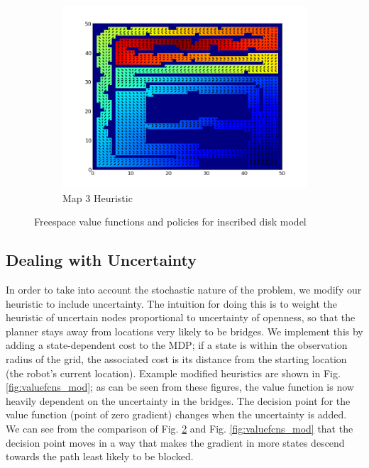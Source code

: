 \documentclass{article}
\begin{document}
\begin{figure}[ht]
\begin{subfigure}[b]{0.45\textwidth}
        \includegraphics[width = \textwidth]{map3value.png}
        \caption{Map 3 Heuristic}
        \label{fig:map3value}
    \end{subfigure}
    \caption{Freespace value functions and policies for inscribed disk model}
    \label{fig:valuefcns}
\end{figure}

\subsection{Dealing with Uncertainty}

In order to take into account the stochastic nature of the problem, we modify our heuristic to include uncertainty. The intuition for doing this is to weight the heuristic of uncertain nodes proportional to uncertainty of openness, so that the planner stays away from locations very likely to be bridges. We implement this by adding a state-dependent cost to the MDP; if a state is within the observation radius of the grid, the associated cost is its distance from the starting location (the robot's current location). Example modified heuristics are shown in Fig. \ref{fig:valuefcns_mod}; as can be seen from these figures, the value function is now heavily dependent on the uncertainty in the bridges. The decision point for the value function (point of zero gradient) changes when the uncertainty is added. We can see from the comparison of Fig. \ref{fig:valuefcns} and Fig. \ref{fig:valuefcns_mod} that the decision point moves in a way that makes the gradient in more states descend towards the path least likely to be blocked.
\end{document}
